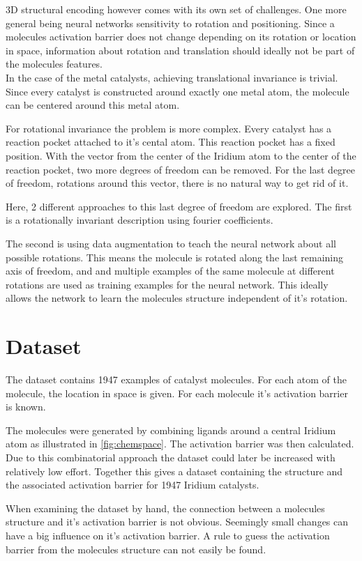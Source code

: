 3D structural encoding however comes with its own set of challenges. 
One more general being neural networks sensitivity to rotation and positioning.
Since a molecules activation barrier does not change depending on its rotation or location in space, 
information about rotation and translation should ideally not be part of the molecules features.
\\
In the case of the metal catalysts, achieving translational invariance is trivial.
Since every catalyst is constructed around exactly one metal atom, the molecule can be centered around this metal atom.

For rotational invariance the problem is more complex.
Every catalyst has a reaction pocket attached to it's cental atom.
This reaction pocket has a fixed position.
With the vector from the center of the Iridium atom to the center of the reaction pocket, two more degrees of freedom can be removed.
For the last degree of freedom, rotations around this vector, there is no natural way to get rid of it.

Here, 2 different approaches to this last degree of freedom are explored.
The first is a rotationally invariant description using fourier coefficients.

The second is using data augmentation to teach the neural network about all possible rotations.
This means the molecule is rotated along the last remaining axis of freedom, and and multiple examples of the same molecule at different rotations are used as training examples for the neural network.
This ideally allows the network to learn the molecules structure independent of it's rotation.


\section{Dataset}

The dataset contains 1947 examples of catalyst molecules.
For each atom of the molecule, the location in space is given.
For each molecule it's activation barrier is known.

The molecules were generated by combining ligands around a central Iridium atom as illustrated in \autoref{fig:chemspace}.
The activation barrier was then calculated.
Due to this combinatorial approach the dataset could later be increased with relatively low effort.
Together this gives a dataset containing the structure and the associated activation barrier for 1947 Iridium catalysts.

When examining the dataset by hand, the connection between a molecules structure and it's activation barrier is not obvious.
Seemingly small changes can have a big influence on it's activation barrier.
A rule to guess the activation barrier from the molecules structure can not easily be found.


